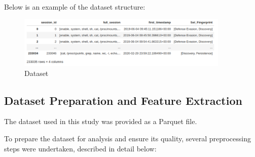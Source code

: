         Below is an example of the dataset structure:

        \begin{figure}[h!]
            \centering
            \includegraphics[width=0.9\textwidth]{figures/others/dataset_1.png}
            \vspace{-1em}
            \caption{Dataset}
            \label{fig:dataset_example}
        \end{figure}

    \vspace{-1em}

    \subsection{Dataset Preparation and Feature Extraction}

        The dataset used in this study was provided as a Parquet file.

        To prepare the dataset for analysis and ensure its quality, several preprocessing steps were undertaken, described in detail below:

